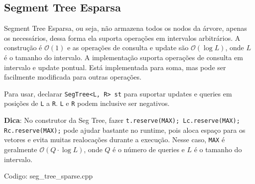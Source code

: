 \documentclass[10pt, a4paper, oneside]{book}
\begin{document}
\subsection{Segment Tree Esparsa}


Segment Tree Esparsa, ou seja, não armazena todos os nodos da árvore, apenas os necessários, dessa forma ela suporta operações em intervalos arbitrários. A construção é $\mathcal{O}(1)$ e as operações de consulta e update são $\mathcal{O}(\log L)$, onde $L$ é o tamanho do intervalo. A implementação suporta operações de consulta em intervalo e update pontual. Está implementada para soma, mas pode ser facilmente modificada para outras operações. 



Para usar, declarar \texttt{SegTree<L, R> st} para suportar updates e queries em posições de \texttt{L} a \texttt{R}. \texttt{L} e \texttt{R} podem inclusive ser negativos.



\textbf{Dica}: No construtor da Seg Tree, fazer \texttt{t.reserve(MAX); Lc.reserve(MAX); Rc.reserve(MAX);} pode ajudar bastante no runtime, pois aloca espaço para os vetores e evita muitas realocações durante a execução. Nesse caso, \texttt{MAX} é geralmente $\mathcal{O}(Q \cdot \log L)$, onde $Q$ é o número de queries e $L$ é o tamanho do intervalo.
\hfill

Codigo: seg\_tree\_sparse.cpp
\end{document}
